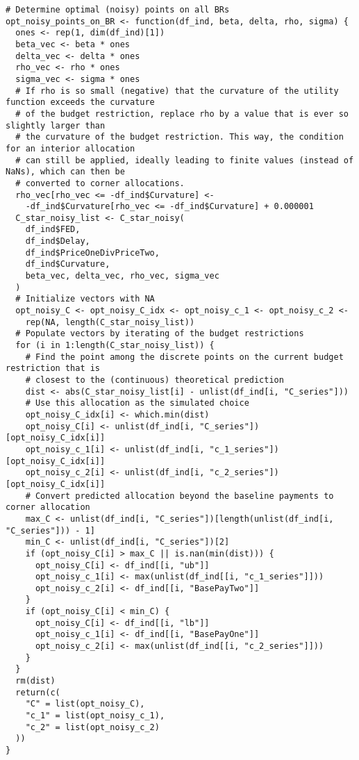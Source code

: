 \documentclass[12pt, a4paper, oneside]{article}
\theoremstyle{Plain}
\theoremstyle{Definition}
\theoremstyle{Remark}
\begin{document}
\begin{appendix}
\begin{lstlisting}
# Determine optimal (noisy) points on all BRs
opt_noisy_points_on_BR <- function(df_ind, beta, delta, rho, sigma) {
  ones <- rep(1, dim(df_ind)[1])
  beta_vec <- beta * ones
  delta_vec <- delta * ones
  rho_vec <- rho * ones
  sigma_vec <- sigma * ones
  # If rho is so small (negative) that the curvature of the utility function exceeds the curvature
  # of the budget restriction, replace rho by a value that is ever so slightly larger than
  # the curvature of the budget restriction. This way, the condition for an interior allocation
  # can still be applied, ideally leading to finite values (instead of NaNs), which can then be
  # converted to corner allocations.
  rho_vec[rho_vec <= -df_ind$Curvature] <-
    -df_ind$Curvature[rho_vec <= -df_ind$Curvature] + 0.000001
  C_star_noisy_list <- C_star_noisy(
    df_ind$FED,
    df_ind$Delay,
    df_ind$PriceOneDivPriceTwo,
    df_ind$Curvature,
    beta_vec, delta_vec, rho_vec, sigma_vec
  )
  # Initialize vectors with NA
  opt_noisy_C <- opt_noisy_C_idx <- opt_noisy_c_1 <- opt_noisy_c_2 <-
    rep(NA, length(C_star_noisy_list))
  # Populate vectors by iterating of the budget restrictions
  for (i in 1:length(C_star_noisy_list)) {
    # Find the point among the discrete points on the current budget restriction that is
    # closest to the (continuous) theoretical prediction
    dist <- abs(C_star_noisy_list[i] - unlist(df_ind[i, "C_series"]))
    # Use this allocation as the simulated choice
    opt_noisy_C_idx[i] <- which.min(dist)
    opt_noisy_C[i] <- unlist(df_ind[i, "C_series"])[opt_noisy_C_idx[i]]
    opt_noisy_c_1[i] <- unlist(df_ind[i, "c_1_series"])[opt_noisy_C_idx[i]]
    opt_noisy_c_2[i] <- unlist(df_ind[i, "c_2_series"])[opt_noisy_C_idx[i]]
    # Convert predicted allocation beyond the baseline payments to corner allocation
    max_C <- unlist(df_ind[i, "C_series"])[length(unlist(df_ind[i, "C_series"])) - 1]
    min_C <- unlist(df_ind[i, "C_series"])[2]
    if (opt_noisy_C[i] > max_C || is.nan(min(dist))) {
      opt_noisy_C[i] <- df_ind[[i, "ub"]]
      opt_noisy_c_1[i] <- max(unlist(df_ind[[i, "c_1_series"]]))
      opt_noisy_c_2[i] <- df_ind[[i, "BasePayTwo"]]
    }
    if (opt_noisy_C[i] < min_C) {
      opt_noisy_C[i] <- df_ind[[i, "lb"]]
      opt_noisy_c_1[i] <- df_ind[[i, "BasePayOne"]]
      opt_noisy_c_2[i] <- max(unlist(df_ind[[i, "c_2_series"]]))
    }
  }
  rm(dist)
  return(c(
    "C" = list(opt_noisy_C),
    "c_1" = list(opt_noisy_c_1),
    "c_2" = list(opt_noisy_c_2)
  ))
}


\end{lstlisting}
\end{appendix}
\end{document}
